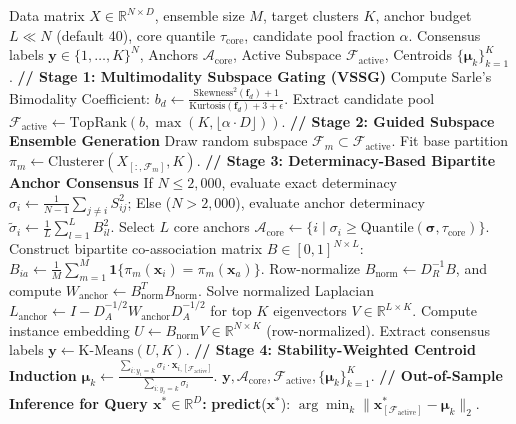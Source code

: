 \documentclass[10pt,conference]{IEEEtran}
\begin{document}
\begin{algorithm}[!t]
\caption{Inductive Consensus Clustering (ICC-v2)}
\label{alg:iccv2}
\begin{algorithmic}[1]
\Require Data matrix $X \in \mathbb{R}^{N \times D}$, ensemble size $M$, target clusters $K$, anchor budget $L \ll N$ (default 40), core quantile $\tau_{\text{core}}$, candidate pool fraction $\alpha$.
\Ensure Consensus labels $\mathbf{y} \in \{1,\dots,K\}^N$, Anchors $\mathcal{A}_{\text{core}}$, Active Subspace $\mathcal{F}_{\text{active}}$, Centroids $\{\boldsymbol{\mu}_k\}_{k=1}^K$.
\Statex \textbf{// Stage 1: Multimodality Subspace Gating (VSSG)}
    \State Compute Sarle's Bimodality Coefficient:
    \State $b_d \leftarrow \frac{\mathrm{Skewness}^2(\mathbf{f}_d) + 1}{\mathrm{Kurtosis}(\mathbf{f}_d) + 3 + \epsilon}$.
\EndFor
\State Extract candidate pool $\mathcal{F}_{\text{active}} \leftarrow \text{TopRank}(b, \max(K, \lfloor \alpha \cdot D \rfloor))$.
\Statex \textbf{// Stage 2: Guided Subspace Ensemble Generation}
    \State Draw random subspace $\mathcal{F}_m \subset \mathcal{F}_{\text{active}}$.
    \State Fit base partition $\pi_m \leftarrow \text{Clusterer}(X_{[:, \mathcal{F}_m]}, K)$.
\EndFor
\Statex \textbf{// Stage 3: Determinacy-Based Bipartite Anchor Consensus}
\State If $N \le 2{,}000$, evaluate exact determinacy $\sigma_i \leftarrow \frac{1}{N-1}\sum_{j \neq i} S_{ij}^2$;
\State Else ($N > 2{,}000$), evaluate anchor determinacy $\tilde{\sigma}_i \leftarrow \frac{1}{L}\sum_{l=1}^L B_{il}^2$.
\State Select $L$ core anchors $\mathcal{A}_{\text{core}} \leftarrow \{i \mid \sigma_i \ge \text{Quantile}(\boldsymbol{\sigma}, \tau_{\text{core}})\}$.
\State Construct bipartite co-association matrix $B \in [0, 1]^{N \times L}$:
\State $B_{ia} \leftarrow \frac{1}{M}\sum_{m=1}^M \mathbf{1}\{\pi_m(\mathbf{x}_i) = \pi_m(\mathbf{x}_a)\}$.
\State Row-normalize $B_{\text{norm}} \leftarrow D_R^{-1} B$, and compute $W_{\text{anchor}} \leftarrow B_{\text{norm}}^T B_{\text{norm}}$.
\State Solve normalized Laplacian $L_{\text{anchor}} \leftarrow I - D_A^{-1/2} W_{\text{anchor}} D_A^{-1/2}$ for top $K$ eigenvectors $V \in \mathbb{R}^{L \times K}$.
\State Compute instance embedding $U \leftarrow B_{\text{norm}} V \in \mathbb{R}^{N \times K}$ (row-normalized).
\State Extract consensus labels $\mathbf{y} \leftarrow \text{K-Means}(U, K)$.
\Statex \textbf{// Stage 4: Stability-Weighted Centroid Induction}
    \State $\boldsymbol{\mu}_k \leftarrow \frac{\sum_{i: y_i = k} \sigma_i \cdot \mathbf{x}_{i, [\mathcal{F}_{\text{active}}]}}{\sum_{i: y_i = k} \sigma_i}$.
\EndFor
\State \Return $\mathbf{y}, \mathcal{A}_{\text{core}}, \mathcal{F}_{\text{active}}, \{\boldsymbol{\mu}_k\}_{k=1}^K$.
\Statex \textbf{// Out-of-Sample Inference for Query $\mathbf{x}^* \in \mathbb{R}^D$:}
\State \textbf{predict}($\mathbf{x}^*$): \Return $\arg\min_k \|\mathbf{x}^*_{[\mathcal{F}_{\text{active}}]} - \boldsymbol{\mu}_k\|_2$.
\end{algorithmic}
\end{algorithm}
\end{document}
